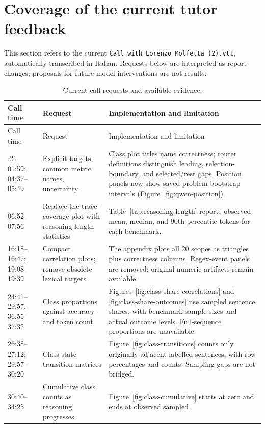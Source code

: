 \section{Coverage of the current tutor feedback}
\label{sec:tutor-chart-coverage}

This section refers to the current \texttt{Call with Lorenzo Molfetta (2).vtt},
automatically transcribed in Italian. Requests below are interpreted as
report changes; proposals for future model interventions are not results.

\begingroup\small
\begin{longtable}{@{}p{.14\linewidth}p{.29\linewidth}p{.49\linewidth}@{}}
\caption{Current-call requests and available evidence.}
\label{tab:tutor-chart-coverage}\\
\toprule
Call time & Request & Implementation and limitation \\
\midrule\endfirsthead
\toprule Call time & Request & Implementation and limitation \\
\midrule\endhead
\bottomrule\endfoot
01:21--01:59; 04:37--05:49 & Explicit targets, common metric names, uncertainty &
Class plot titles name correctness; router definitions distinguish leading,
selection-boundary, and selected/rest gaps. Position panels now show saved
problem-bootstrap intervals (Figure~\ref{fig:qwen-position}). \\
06:52--07:56 & Replace the trace-coverage plot with reasoning-length statistics &
Table~\ref{tab:reasoning-length} reports observed mean, median, and 90th
percentile tokens for each benchmark. \\
16:18--16:47; 19:08--19:39 & Compact correlation plots; remove obsolete lexical targets &
The appendix plots all 20 scopes as triangles plus correctness columns.
Regex-event panels are removed; original numeric artifacts remain available. \\
24:41--29:57; 36:55--37:32 & Class proportions against accuracy and token count &
Figures~\ref{fig:class-share-correlations} and
\ref{fig:class-share-outcomes} use sampled sentence shares, with benchmark
sample sizes and actual outcome levels. Full-sequence proportions are unavailable. \\
26:38--27:12; 29:57--30:20 & Class-state transition matrices &
Figure~\ref{fig:class-transitions} counts only originally adjacent labelled
sentences, with row percentages and counts. Sampling gaps are not bridged. \\
30:40--34:25 & Cumulative class counts as reasoning progresses &
Figure~\ref{fig:class-cumulative} starts at zero and ends at observed sampled

\end{longtable}
